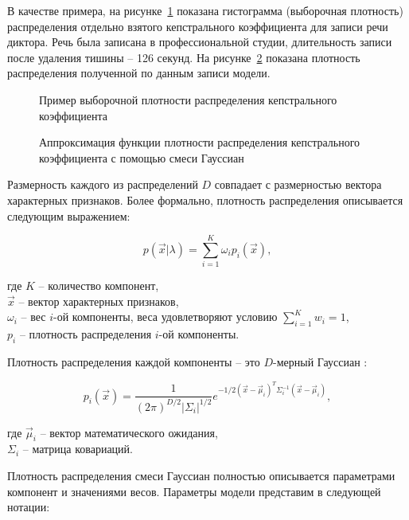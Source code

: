 В качестве примера, на рисунке~\ref{fig:gmm_hist} показана гистограмма (выборочная плотность) распределения отдельно взятого кепстрального коэффициента для записи речи диктора. Речь была записана в профессиональной студии, длительность записи после удаления тишины -- 126 секунд. На рисунке~\ref{fig:gmm_pdf} показана плотность распределения полученной по данным записи модели.

\begin{figure}[t!]
\caption{Пример выборочной плотности распределения кепстрального коэффициента}
\label{fig:gmm_hist}
\end{figure}
\begin{figure}[h!]
\caption{Аппроксимация функции плотности распределения кепстрального коэффициента с помощью смеси Гауссиан}
\label{fig:gmm_pdf}
\end{figure}

Размерность каждого из распределений $D$ совпадает с размерностью вектора характерных признаков. Более формально, плотность распределения описывается следующим выражением:

\begin{equation}
p(\vec x | \lambda) = \sum_{i=1}^K{\omega_i p_i(\vec x)},
\end{equation}

\noindent где $K$ -- количество компонент,\\
$\vec x$ -- вектор характерных признаков,\\
$\omega_i$ -- вес $i$-ой компоненты, веса удовлетворяют условию $\sum_{i=1}^K w_i = 1$,\\
$p_i$ -- плотность распределения $i$-ой компоненты.

Плотность распределения каждой компоненты -- это $D$-мерный Гауссиан \cite{BMSTUM16}:

\begin{equation}
\label{eq:mdnormalpdf}
p_i(\vec x) = \frac{1}{(2\pi)^{D/2} |\Sigma_i|^{1/2}}e^{-1/2(\vec x - \vec \mu_i)^T \Sigma_i^{-1} (\vec x - \vec \mu_i)},
\end{equation}

\noindent где $\vec \mu_i$ -- вектор математического ожидания,\\
$\Sigma_i$ -- матрица ковариаций.

Плотность распределения смеси Гауссиан полностью описывается параметрами компонент и значениями весов. Параметры модели представим в следующей нотации:

